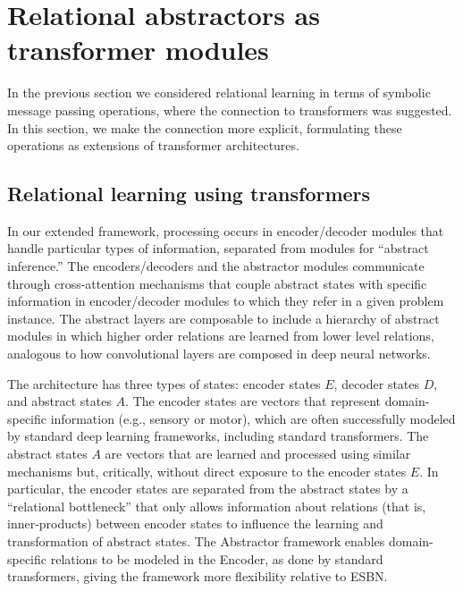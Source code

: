 
\section{Relational abstractors as transformer modules}
\label{sec:abstractors_as_transformer_modules}

In the previous section we considered relational learning
in terms of symbolic message passing operations, where the connection to transformers 
was suggested. In this section, we make the connection more explicit, formulating 
these operations as extensions of transformer architectures.



\subsection{Relational learning using transformers}

In our extended framework, processing occurs in encoder/decoder modules that handle particular types of information,
separated from modules for ``abstract inference.'' The encoders/decoders and the abstractor modules communicate
through cross-attention mechanisms that couple abstract states with specific information in encoder/decoder modules to which they refer in a given problem instance.  The abstract layers are composable to include a hierarchy of abstract modules in which higher order relations are learned from lower level relations, analogous to how convolutional layers are composed in deep neural networks.

The architecture has three types of states: encoder states $E$, decoder states $D$, and abstract states $A$. The encoder states are vectors that represent domain-specific information (e.g., sensory or motor), which are often successfully modeled by standard deep learning frameworks, including standard transformers. The abstract states $A$ are vectors that are learned and processed using similar mechanisms but, critically, without direct exposure to the encoder states $E$.  In particular, the encoder states are separated from the abstract states by a ``relational bottleneck'' that only allows information about relations (that is, inner-products) between encoder states to influence the learning and transformation of abstract states. The Abstractor framework enables domain-specific relations to be modeled in the Encoder, as done by standard transformers, giving the framework more flexibility relative to ESBN. 

